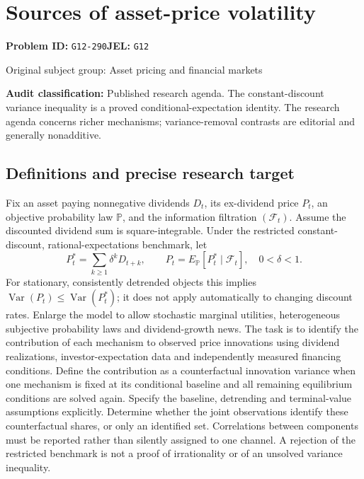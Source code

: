 \documentclass[11pt,a4paper]{article}
\begin{document}
\section*{Sources of asset-price volatility}
\textbf{Problem ID:} \texttt{G12-290}\quad \textbf{JEL:} \texttt{G12}\par
\label{problem:OP-0311}
{\sffamily\small\color{muted}Original subject group: Asset pricing and financial markets\par}
\label{definitions:problem:30007593}
\textbf{Audit classification:} Published research agenda. The constant-discount variance inequality is a proved conditional-expectation identity. The research agenda concerns richer mechanisms; variance-removal contrasts are editorial and generally nonadditive.
\subsection*{Definitions and precise research target}
Fix an asset paying nonnegative dividends \(D_t\), its ex-dividend price \(P_t\), an objective probability law \(\mathbb P\), and the information filtration \((\mathcal F_t)\). Assume the discounted dividend sum is square-integrable. Under the restricted constant-discount, rational-expectations benchmark, let
\[P_t^*=\sum_{k\geq1}\delta^kD_{t+k},\qquad P_t=E_{\mathbb P}[P_t^*\mid\mathcal F_t],\quad0<\delta<1.\]
For stationary, consistently detrended objects this implies \(\operatorname{Var}(P_t)\leq\operatorname{Var}(P_t^*)\); it does not apply automatically to changing discount rates. Enlarge the model to allow stochastic marginal utilities, heterogeneous subjective probability laws and dividend-growth news. The task is to identify the contribution of each mechanism to observed price innovations using dividend realizations, investor-expectation data and independently measured financing conditions. Define the contribution as a counterfactual innovation variance when one mechanism is fixed at its conditional baseline and all remaining equilibrium conditions are solved again. Specify the baseline, detrending and terminal-value assumptions explicitly. Determine whether the joint observations identify these counterfactual shares, or only an identified set. Correlations between components must be reported rather than silently assigned to one channel. A rejection of the restricted benchmark is not a proof of irrationality or of an unsolved variance inequality.
\end{document}
